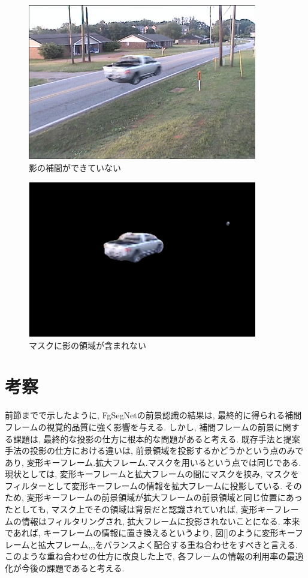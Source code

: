 \documentclass[a4paper,12pt]{jsreport}
\begin{document}
\begin{figure}[h]
  \begin{center}
    \includegraphics[width=10cm]{./inada_method.bmp}
    \caption{影の補間ができていない}
  \end{center}
\end{figure}

\begin{figure}[h]
  \begin{center}
    \includegraphics[width=10cm]{./fgsegnet_kage.png}
    \caption{マスクに影の領域が含まれない}
  \end{center}
\end{figure}


\section{考察}
前節までで示したように, FgSegNetの前景認識の結果は, 最終的に得られる補間フレームの視覚的品質に強く影響を与える. しかし, 補間フレームの前景に関する課題は, 最終的な投影の仕方に根本的な問題があると考える. 
既存手法と提案手法の投影の仕方における違いは, 前景領域を投影するかどうかという点のみであり, 変形キーフレーム.拡大フレーム.マスクを用いるという点では同じである. 現状としては, 変形キーフレームと拡大フレームの間にマスクを挟み, マスクをフィルターとして変形キーフレームの情報を拡大フレームに投影している. そのため, 変形キーフレームの前景領域が拡大フレームの前景領域と同じ位置にあったとしても, マスク上でその領域は背景だと認識されていれば, 変形キーフレームの情報はフィルタリングされ, 拡大フレームに投影されないことになる. 
本来であれば, キーフレームの情報に置き換えるというより, 図[]のように変形キーフレームと拡大フレーム,,,をバランスよく配合する重ね合わせをすべきと言える. このような重ね合わせの仕方に改良した上で, 各フレームの情報の利用率の最適化が今後の課題であると考える. 
\end{document}
